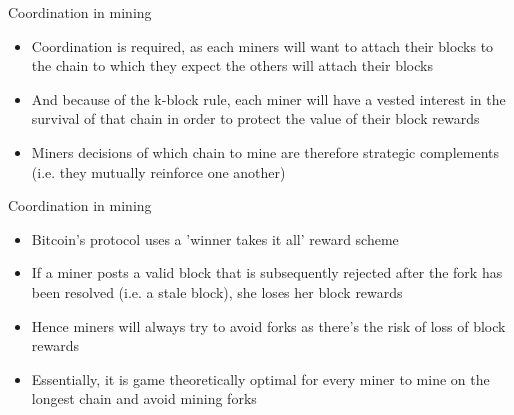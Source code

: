 \documentclass[10pt]{beamer}
\begin{document}

\begin{frame}{Coordination in mining}
	\begin{itemize}
		\item Coordination is required, as each miners will want to attach their blocks to the chain to which they expect the others will attach their blocks
		\item And because of the k-block rule, each miner will have a vested interest in the survival of that chain in order to protect the value of their block rewards
		\item Miners decisions of which chain to mine are therefore strategic complements (i.e. they mutually reinforce one another)
	\end{itemize}
\end{frame}



\begin{frame}{Coordination in mining}
	\begin{itemize}
		\item Bitcoin's protocol uses a 'winner takes it all' reward scheme
		\item If a miner posts a valid block that is subsequently rejected after the fork has been resolved (i.e. a stale block), she loses her block rewards
		\item Hence miners will always try to avoid forks as there's the risk of loss of block rewards
		\item Essentially, it is game theoretically optimal for every miner to mine on the longest chain and avoid mining forks
	\end{itemize}
\end{frame}

\end{document}
